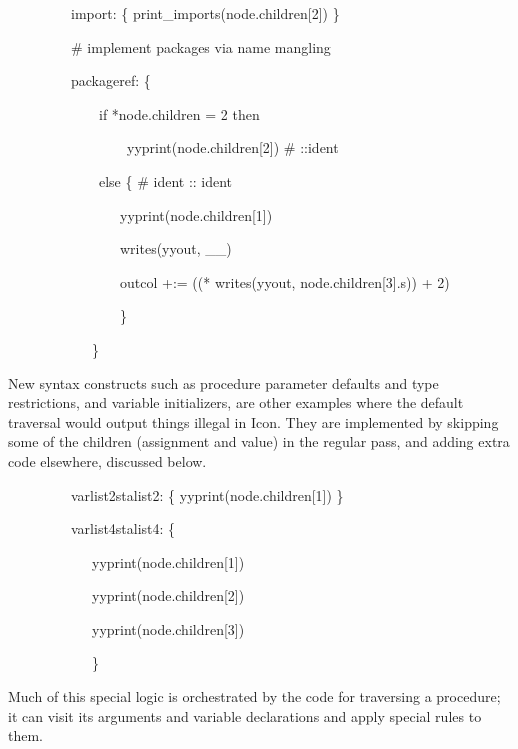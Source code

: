 {\ttfamily\mdseries
\ \ \ \ \ \ \ \ \ {\textquotedbl}import{\textquotedbl}: \{ print\_imports(node.children[2]) \}}

{\ttfamily\mdseries
\ \ \ \ \ \ \ \ \ \# implement packages via name mangling}

{\ttfamily\mdseries
\ \ \ \ \ \ \ \ \ {\textquotedbl}packageref{\textquotedbl}: \{}

{\ttfamily\mdseries
\ \ \ \ \ \ \ \ \ \ \ \ \ if *node.children = 2 then}

{\ttfamily\mdseries
\ \ \ \ \ \ \ \ \ \ \ \ \ \ \ \ \ yyprint(node.children[2]) \# ::ident}

{\ttfamily\mdseries
\ \ \ \ \ \ \ \ \ \ \ \ \ else \{ \# ident :: ident}

{\ttfamily\mdseries
\ \ \ \ \ \ \ \ \ \ \ \ \ \ \ \ yyprint(node.children[1])}

{\ttfamily\mdseries
\ \ \ \ \ \ \ \ \ \ \ \ \ \ \ \ writes(yyout, {\textquotedbl}\_\_{\textquotedbl})}

{\ttfamily\mdseries
\ \ \ \ \ \ \ \ \ \ \ \ \ \ \ \ outcol +:= ((* writes(yyout, node.children[3].s)) + 2)}

{\ttfamily\mdseries
\ \ \ \ \ \ \ \ \ \ \ \ \ \ \ \ \}}

{\ttfamily\mdseries
\ \ \ \ \ \ \ \ \ \ \ \ \}}


New syntax constructs such as procedure parameter defaults and type
restrictions, and variable initializers, are other examples where the
default traversal would output things illegal in Icon. They are
implemented by skipping some of the children (assignment and value) in
the regular pass, and adding extra code elsewhere, discussed below.

{\ttfamily\mdseries
\ \ \ \ \ \ \ \ \ {\textquotedbl}varlist2{\textquotedbl}{\textbar}{\textquotedbl}stalist2{\textquotedbl}: \{
yyprint(node.children[1]) \}}

{\ttfamily\mdseries
\ \ \ \ \ \ \ \ \ {\textquotedbl}varlist4{\textquotedbl}{\textbar}{\textquotedbl}stalist4{\textquotedbl}: \{}

{\ttfamily\mdseries
\ \ \ \ \ \ \ \ \ \ \ \ yyprint(node.children[1])}

{\ttfamily\mdseries
\ \ \ \ \ \ \ \ \ \ \ \ yyprint(node.children[2])}

{\ttfamily\mdseries
\ \ \ \ \ \ \ \ \ \ \ \ yyprint(node.children[3])}

{\ttfamily\mdseries
\ \ \ \ \ \ \ \ \ \ \ \ \}}


Much of this special logic is orchestrated by the code for traversing
a procedure; it can visit its arguments and variable declarations and
apply special rules to them.

